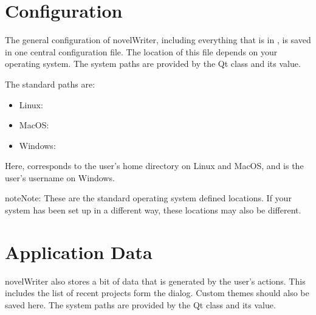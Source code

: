 \documentclass[a4paper,11pt,english]{sphinxmanual}
\begin{document}
\section{Configuration}
\label{\detokenize{tech_locations:configuration}}\label{\detokenize{tech_locations:a-locations-conf}}
\sphinxAtStartPar
The general configuration of novelWriter, including everything that is in , is saved
in one central configuration file. The location of this file depends on your operating system. The
system paths are provided by the Qt  class and its  value.

\sphinxAtStartPar
The standard paths are:
\begin{itemize}
\item {} 
\sphinxAtStartPar
Linux: 

\item {} 
\sphinxAtStartPar
MacOS: 

\item {} 
\sphinxAtStartPar
Windows: 

\end{itemize}

\sphinxAtStartPar
Here, \sphinxcode{\sphinxupquote{\textasciitilde{}}} corresponds to the user’s home directory on Linux and MacOS, and  is the
user’s username on Windows.

\begin{sphinxadmonition}{note}{Note:}
\sphinxAtStartPar
These are the standard operating system defined locations. If your system has been set up in a
different way, these locations may also be different.
\end{sphinxadmonition}


\section{Application Data}
\label{\detokenize{tech_locations:application-data}}\label{\detokenize{tech_locations:a-locations-data}}
\sphinxAtStartPar
novelWriter also stores a bit of data that is generated by the user’s actions. This includes the
list of recent projects form the  dialog. Custom themes should also be saved here. The
system paths are provided by the Qt  class and its  value.
\end{document}
